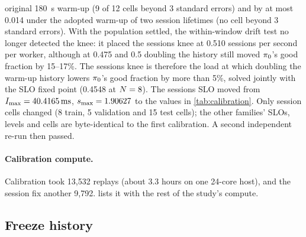 original \SI{180}{s} warm-up (9 of 12 cells beyond 3 standard errors) and by at most 0.014 under
the adopted warm-up of two session lifetimes (no cell beyond 3 standard errors).
With the population settled, the within-window drift test no longer detected the knee: it placed
the sessions knee at 0.510 sessions per second per worker, although at 0.475 and 0.5 doubling the
history still moved $\pi_{0}$'s good fraction by 15--17\%. The sessions knee is therefore the load
at which doubling the warm-up history lowers $\pi_{0}$'s good fraction by more than 5\%, solved
jointly with the SLO fixed point (0.4548 at $N = 8$). The sessions SLO moved from
$I_{\max} = \SI{40.4165}{ms}$, $s_{\max} = 1.90627$ to the values in \cref{tab:calibration}. Only session
cells changed (8 train, 5 validation and 15 test cells); the other families' SLOs, levels and
cells are byte-identical to the first calibration. A second independent re-run then passed.

\paragraph{Calibration compute.}
Calibration took 13,532 replays (about 3.3 hours on one 24-core host), and the session fix
another 9,792.
 lists it with the rest of the study's compute.

\subsection{Freeze history}
\label{app:freeze}

